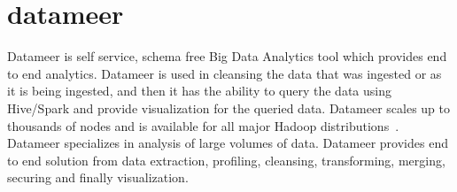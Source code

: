 \section{datameer}

Datameer is self service, schema free Big Data Analytics tool which provides end to end analytics. 
Datameer is used in cleansing the data that was ingested or as it is being ingested, and then it 
has the ability to query the data using Hive/Spark and provide visualization for the queried data. 
Datameer scales up to thousands of nodes and is available for all major Hadoop 
distributions~\cite{datameer}. Datameer specializes in analysis of large volumes of data. 
Datameer provides end to end solution from data extraction, profiling, cleansing, 
transforming, merging, securing and finally visualization.
